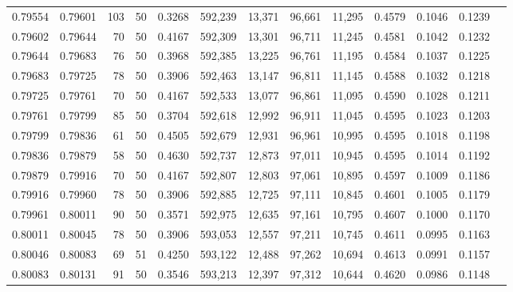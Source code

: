 \begin{tabular}{rrrrrrrrrrrrr}
0.79554 & 0.79601 &   103 &  50 &                                     0.3268 & 592,239 &  13,371 &  96,661 &  11,295 & 0.4579 & 0.1046 & 0.1239 \\
0.79602 & 0.79644 &    70 &  50 &                                     0.4167 & 592,309 &  13,301 &  96,711 &  11,245 & 0.4581 & 0.1042 & 0.1232 \\
0.79644 & 0.79683 &    76 &  50 &                                     0.3968 & 592,385 &  13,225 &  96,761 &  11,195 & 0.4584 & 0.1037 & 0.1225 \\
0.79683 & 0.79725 &    78 &  50 &                                     0.3906 & 592,463 &  13,147 &  96,811 &  11,145 & 0.4588 & 0.1032 & 0.1218 \\
0.79725 & 0.79761 &    70 &  50 &                                     0.4167 & 592,533 &  13,077 &  96,861 &  11,095 & 0.4590 & 0.1028 & 0.1211 \\
0.79761 & 0.79799 &    85 &  50 &                                     0.3704 & 592,618 &  12,992 &  96,911 &  11,045 & 0.4595 & 0.1023 & 0.1203 \\
0.79799 & 0.79836 &    61 &  50 &                                     0.4505 & 592,679 &  12,931 &  96,961 &  10,995 & 0.4595 & 0.1018 & 0.1198 \\
0.79836 & 0.79879 &    58 &  50 &                                     0.4630 & 592,737 &  12,873 &  97,011 &  10,945 & 0.4595 & 0.1014 & 0.1192 \\
0.79879 & 0.79916 &    70 &  50 &                                     0.4167 & 592,807 &  12,803 &  97,061 &  10,895 & 0.4597 & 0.1009 & 0.1186 \\
0.79916 & 0.79960 &    78 &  50 &                                     0.3906 & 592,885 &  12,725 &  97,111 &  10,845 & 0.4601 & 0.1005 & 0.1179 \\
0.79961 & 0.80011 &    90 &  50 &                                     0.3571 & 592,975 &  12,635 &  97,161 &  10,795 & 0.4607 & 0.1000 & 0.1170 \\
0.80011 & 0.80045 &    78 &  50 &                                     0.3906 & 593,053 &  12,557 &  97,211 &  10,745 & 0.4611 & 0.0995 & 0.1163 \\
0.80046 & 0.80083 &    69 &  51 &                                     0.4250 & 593,122 &  12,488 &  97,262 &  10,694 & 0.4613 & 0.0991 & 0.1157 \\
0.80083 & 0.80131 &    91 &  50 &                                     0.3546 & 593,213 &  12,397 &  97,312 &  10,644 & 0.4620 & 0.0986 & 0.1148 \\

\end{tabular}
